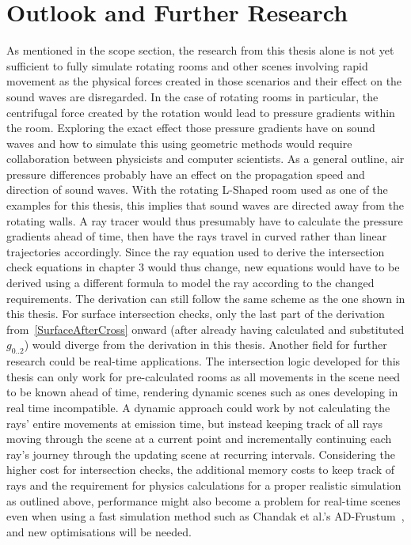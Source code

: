 \chapter{Outlook and Further Research}

As mentioned in the scope section,
the research from this thesis alone is not yet sufficient to fully simulate rotating rooms
and other scenes involving rapid movement
as the physical forces created in those scenarios and their effect on the sound waves are disregarded.
\newline
In the case of rotating rooms in particular,
the centrifugal force created by the rotation would lead to pressure gradients within the room.
Exploring the exact effect those pressure gradients have on sound waves
and how to simulate this using geometric methods would require collaboration between physicists and computer scientists.
\newline
As a general outline, air pressure differences probably have an effect on the propagation speed and direction of sound waves.
With the rotating L-Shaped room used as one of the examples for this thesis,
this implies that sound waves are directed away from the rotating walls.
A ray tracer would thus presumably have to calculate the pressure gradients ahead of time,
then have the rays travel in curved rather than linear trajectories accordingly.
\newline
Since the ray equation used to derive the intersection check equations in chapter 3 would thus change,
new equations would have to be derived using a different formula to model the ray according to the changed requirements.
The derivation can still follow the same scheme as the one shown in this thesis.
For surface intersection checks, only the last part of the derivation from~\eqref{SurfaceAfterCross} onward
(after already having calculated and substituted \(g_{0..2}\)) would diverge from the derivation in this thesis.
\newline
Another field for further research could be real-time applications.
The intersection logic developed for this thesis can only work for pre-calculated rooms
as all movements in the scene need to be known ahead of time,
rendering dynamic scenes such as ones developing in real time incompatible.
\newline
A dynamic approach could work by not calculating the rays' entire movements at emission time,
but instead keeping track of all rays moving through the scene at a current point
and incrementally continuing each ray's journey through the updating scene at recurring intervals.
\newline
Considering the higher cost for intersection checks,
the additional memory costs to keep track of rays
and the requirement for physics calculations for a proper realistic simulation as outlined above,
performance might also become a problem for real-time scenes even when using a fast simulation method such as Chandak et al.'s AD-Frustum~\cite{Cha08},
and new optimisations will be needed.
